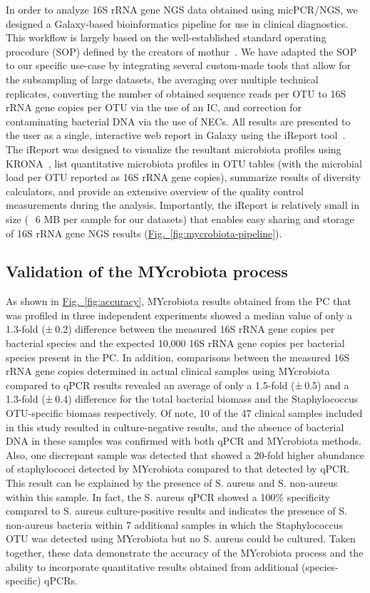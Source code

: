 In order to analyze 16S rRNA gene NGS data obtained using micPCR/NGS, we designed a Galaxy-based bioinformatics pipeline for use in clinical diagnostics. This workflow is largely based on the well-established standard operating procedure (SOP) defined by the creators of mothur~\cite{kozich2013development}. We have adapted the SOP to our specific use-case by integrating several custom-made tools that allow for the subsampling of large datasets, the averaging over multiple technical replicates, converting the number of obtained sequence reads per OTU to 16S rRNA gene copies per OTU via the use of an IC, and correction for contaminating bacterial DNA via the use of NECs. All results are presented to the user as a single, interactive web report in Galaxy using the iReport tool~\cite{hiltemann2014ireport}. The iReport was designed to visualize the resultant microbiota profiles using KRONA~\cite{ondov2011interactive}, list quantitative microbiota profiles in OTU tables (with the microbial load per OTU reported as 16S rRNA gene copies), summarize results of diversity calculators, and provide an extensive overview of the quality control measurements during the analysis. Importantly, the iReport is relatively small in size (~ 6 MB per sample for our datasets) that enables easy sharing and storage of 16S rRNA gene NGS results (\hyperref[fig:mycrobiota-pipeline]{Fig.~\ref{fig:mycrobiota-pipeline}}).


\subsection*{Validation of the MYcrobiota process}

As shown in \hyperref[fig:accuracy]{Fig.~\ref{fig:accuracy}}, MYcrobiota results obtained from the PC that was profiled in three independent experiments showed a median value of only a 1.3-fold (± 0.2) difference between the measured 16S rRNA gene copies per bacterial species and the expected 10,000 16S rRNA gene copies per bacterial species present in the PC\@. In addition, comparisons between the measured 16S rRNA gene copies determined in actual clinical samples using MYcrobiota compared to qPCR results revealed an average of only a 1.5-fold (± 0.5) and a 1.3-fold (± 0.4) difference for the total bacterial biomass and the Staphylococcus OTU-specific biomass respectively. Of note, 10 of the 47 clinical samples included in this study resulted in culture-negative results, and the absence of bacterial DNA in these samples was confirmed with both qPCR and MYcrobiota methods. Also, one discrepant sample was detected that showed a 20-fold higher abundance of staphylococci detected by MYcrobiota compared to that detected by qPCR\@. This result can be explained by the presence of S. aureus and S. non-aureus within this sample. In fact, the S. aureus qPCR showed a 100\% specificity compared to S. aureus culture-positive results and indicates the presence of S. non-aureus bacteria within 7 additional samples in which the Staphylococcus OTU was detected using MYcrobiota but no S. aureus could be cultured. Taken together, these data demonstrate the accuracy of the MYcrobiota process and the ability to incorporate quantitative results obtained from additional (species-specific) qPCRs\@.



